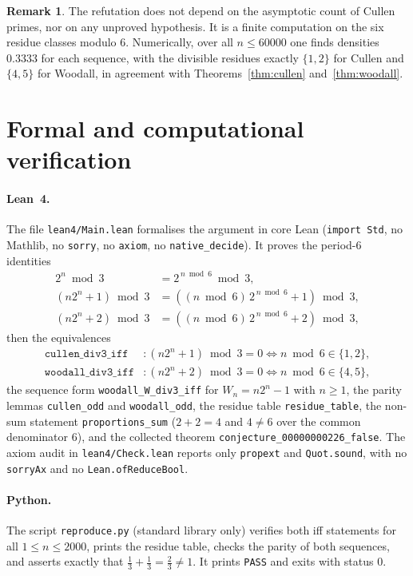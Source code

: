 \documentclass[11pt]{article}
\theoremstyle{definition}
\newtheorem{remark}[theorem]{Remark}
\newcommand{\Woo}{W}
\begin{document}
\begin{remark}
The refutation does not depend on the asymptotic count of Cullen primes, nor
on any unproved hypothesis. It is a finite computation on the six residue
classes modulo \(6\). Numerically, over all \(n\le 60000\) one finds densities
\(0.3333\) for each sequence, with the divisible residues exactly \(\{1,2\}\)
for Cullen and \(\{4,5\}\) for Woodall, in agreement with
Theorems~\ref{thm:cullen} and~\ref{thm:woodall}.
\end{remark}

\section{Formal and computational verification}

\paragraph{Lean~4.}
The file \texttt{lean4/Main.lean} formalises the argument in core Lean
(\texttt{import Std}, no Mathlib, no \texttt{sorry}, no \texttt{axiom}, no
\texttt{native\_decide}). It proves the period-\(6\) identities
\begin{align*}
2^n \bmod 3 &= 2^{\,n\bmod 6} \bmod 3,\\
(n2^n+1)\bmod 3 &= ((n\bmod 6)\,2^{\,n\bmod 6}+1)\bmod 3,\\
(n2^n+2)\bmod 3 &= ((n\bmod 6)\,2^{\,n\bmod 6}+2)\bmod 3,
\end{align*}
then the equivalences
\begin{align*}
\texttt{cullen\_div3\_iff} &: (n2^n+1)\bmod 3 = 0 \iff n\bmod 6\in\{1,2\},\\
\texttt{woodall\_div3\_iff} &: (n2^n+2)\bmod 3 = 0 \iff n\bmod 6\in\{4,5\},
\end{align*}
the sequence form \texttt{woodall\_W\_div3\_iff} for
\(\Woo_n=n2^n-1\) with \(n\ge 1\), the parity lemmas
\texttt{cullen\_odd} and \texttt{woodall\_odd}, the residue table
\texttt{residue\_table}, the non-sum statement \texttt{proportions\_sum}
(\(2+2=4\) and \(4\neq 6\) over the common denominator \(6\)), and the
collected theorem \texttt{conjecture\_00000000226\_false}. The axiom audit in
\texttt{lean4/Check.lean} reports only \texttt{propext} and
\texttt{Quot.sound}, with no \texttt{sorryAx} and no
\texttt{Lean.ofReduceBool}.

\paragraph{Python.}
The script \texttt{reproduce.py} (standard library only) verifies both iff
statements for all \(1\le n\le 2000\), prints the residue table, checks the
parity of both sequences, and asserts exactly that
\(\frac13+\frac13=\frac23\neq 1\). It prints \texttt{PASS} and exits with
status \(0\).
\end{document}
